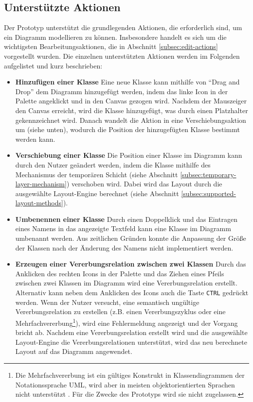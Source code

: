 \subsection{Unterstützte Aktionen}
\label{subsec:supported-actions}

Der Prototyp unterstützt die grundlegenden Aktionen, die erforderlich sind, um ein Diagramm modellieren zu können. Insbesondere handelt es sich um die wichtigsten Bearbeitungsaktionen, die in Abschnitt \ref{subsec:edit-actions} vorgestellt wurden. Die einzelnen unterstützten Aktionen werden im Folgenden aufgelistet und kurz beschrieben:

\begin{itemize}

\item
\textbf{Hinzufügen einer Klasse}
Eine neue Klasse kann mithilfe von \enquote{Drag and Drop} dem Diagramm hinzugefügt werden, indem das linke Icon in der Palette angeklickt und in den Canvas gezogen wird. Nachdem der Mauszeiger den Canvas erreicht, wird die Klasse hinzugefügt, was durch einen Platzhalter gekennzeichnet wird. Danach wandelt die Aktion in eine Verschiebungsaktion um (siehe unten), wodurch die Position der hinzugefügten Klasse bestimmt werden kann.

\item
\textbf{Verschiebung einer Klasse}
Die Position einer Klasse im Diagramm kann durch den Nutzer geändert werden, indem die Klasse mithilfe des Mechanismus der temporären Schicht (siehe Abschnitt \ref{subsec:temporary-layer-mechanism}) verschoben wird. Dabei wird das Layout durch die ausgewählte Layout-Engine berechnet (siehe Abschnitt \ref{subsec:supported-layout-methods}).

\item
\textbf{Umbenennen einer Klasse}
Durch einen Doppelklick und das Eintragen eines Namens in das angezeigte Textfeld kann eine Klasse im Diagramm umbenannt werden. Aus zeitlichen Gründen konnte die Anpassung der Größe der Klassen nach der Änderung des Namens nicht implementiert werden.

\newpage

\item
\textbf{Erzeugen einer Vererbungsrelation zwischen zwei Klassen}
Durch das Anklicken des rechten Icons in der Palette und das Ziehen eines Pfeils zwischen zwei Klassen im Diagramm wird eine Vererbungsrelation erstellt. Alternativ kann neben dem Anklicken des Icons auch die Taste \texttt{CTRL} gedrückt werden. Wenn der Nutzer versucht, eine semantisch ungültige Vererbungsrelation zu erstellen (z.B. einen Vererbungszyklus oder eine Mehrfachvererbung\footnote{Die Mehrfachvererbung ist ein gültiges Konstrukt in Klassendiagrammen der Notationssprache UML, wird aber in meisten objektorientierten Sprachen nicht unterstützt \cite{ArlowNeustadt05UML-2-and-the-Unified}. Für die Zwecke des Prototyps wird sie nicht zugelassen.}), wird eine Fehlermeldung angezeigt und der Vorgang bricht ab. Nachdem eine Vererbungsrelation erstellt wird und die ausgewählte Layout-Engine die Vererbungsrelationen unterstützt, wird das neu berechnete Layout auf das Diagramm angewendet.


\end{itemize}
